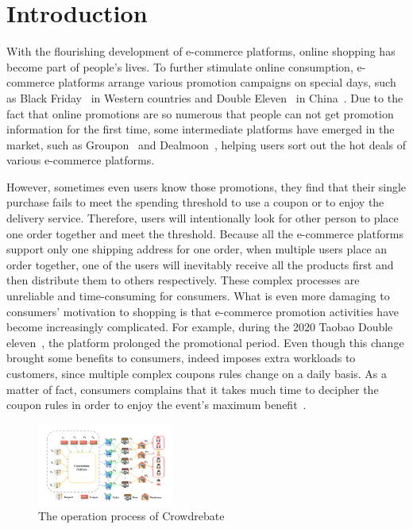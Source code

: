 \section{Introduction}

With the flourishing development of e-commerce platforms, online shopping has become part of people's lives. To further stimulate online consumption, e-commerce platforms arrange various promotion campaigns on special days, such as Black Friday~\cite{2013Black} in Western countries and Double Eleven~\cite{double11} in China~\cite{huang2019x}. Due to the fact that online promotions are so numerous that people can not get promotion information for the first time, some intermediate platforms have emerged in the market, such as Groupon~\cite{groupon} and Dealmoon~\cite{dealmoon}, helping users sort out the hot deals of various e-commerce platforms.

However, sometimes even users know those promotions, they find that their single purchase fails to meet the spending threshold to use a coupon or to enjoy the delivery service. Therefore, users will intentionally look for other person to place one order together and meet the threshold. Because all the e-commerce platforms support only one shipping address for one order, when multiple users place an order together, one of the users will inevitably receive all the products first and then distribute them to others respectively. These complex processes are unreliable and time-consuming for consumers. What is even more damaging to consumers' motivation to shopping is that e-commerce promotion activities have become increasingly complicated. For example, during the 2020 Taobao Double eleven~\cite{2020}, the platform prolonged the promotional period. Even though this change brought some benefits to consumers, indeed imposes extra workloads to customers, since multiple complex coupons rules change on a daily basis. As a matter of fact, consumers complains that it takes much time to decipher the coupon rules in order to enjoy the event's maximum benefit~\cite{double2020}.
\begin{figure}[t] 
\centering %
		\includegraphics[width=0.4\textwidth]{../figure/crowdrebate process.png} %
	\caption{The operation process of Crowdrebate} %
	\label{fig:Crowdrebate} %
	\end{figure}

